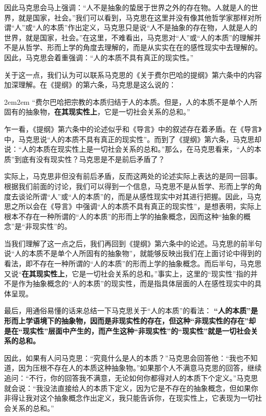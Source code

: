 \documentclass[a4paper,twoside,12pt,AutoFakeBold]{ctexart}
\begin{document}
因此马克思会马上强调：“人不是抽象的蛰居于世界之外的存在物。人就是人的世界，就是国家，社会。”我们可以看到，马克思在这里并没有像其他哲学家那样对所谓“人”或“人的本质”作出定义，马克思只是说“人不是抽象的存在物，人就是人的世界，就是国家，社会。”在这里，不难看出，马克思对“人”或“人的本质”的理解并不是从哲学、形而上学的角度去理解的，而是从实实在在的感性现实中去理解的。因此，马克思会着重强调：“人的本质不具有真正的现实性。”

关于这一点，我们认为可以联系马克思的《关于费尔巴哈的提纲》第六条中的内容加深理解。在《提纲》的第六条，马克思是这么说的：

\begin{adjustwidth}{2em}{2em}
\qquad\fangsong
“费尔巴哈把宗教的本质归结于人的本质。但是，人的本质不是单个人所固有的抽象物，\textbf{在其现实性上}，它是一切社会关系的总和。”
\end{adjustwidth}

乍一看，《提纲》第六条中的论述似乎和《导言》中的叙述存在着矛盾。在《导言》中，马克思说“人的本质不具有真正的现实性”。而到了《提纲》第六条，马克思却说：“人的本质在现实性上是一切社会关系的总和。”那么，在马克思看来，“人的本质”到底有没有现实性？马克思是不是前后矛盾了？

实际上，马克思非但没有前后矛盾，反而这两处的论述实际上表达的是同一回事。根据我们前面的讨论，我们可以得到一个信息，马克思不是从哲学、形而上学的角度去谈论所谓“人”或“人的本质”的，而是从感性现实中对其进行把握。因此，马克思之所以会在《导言》中强调“人的本质不具有真正的现实性”，是想表明，实际上根本不存在一种所谓的“人的本质”的形而上学的抽象概念，因而这种“抽象的概念”是“非现实性”的。

当我们理解了这一点之后，我们再回到《提纲》第六条中的论述。马克思的前半句说“人的本质不是单个人所固有的抽象物”，就能够反映出我们在上面讨论中得到的看法，即不存在一种所谓的“人的本质”的形而上学的抽象概念。而后半句，马克思又说“\textbf{在其现实性上}，它是一切社会关系的总和。”事实上，这里的“现实性”指的并不是作为抽象概念的“人的本质”的现实性，而是指具体层面的人在感性现实中的具体呈现。

最后，用通俗易懂的话来总结一下马克思关于“人的本质”的看法：
\textbf{“人的本质”是形而上学语境下的抽象物，因而是非现实性的存在，但这种“非现实性的存在”却是在“现实性”层面中产生的，而产生这种“非现实性”的“现实性”就是一切社会关系的总和。}

{\kaishu 因此，如果有人问马克思：“究竟什么是人的本质？”马克思会回答他：“我也不知道，因为压根不存在人的本质这种抽象物。”如果那个人不满意马克思的回答，继续追问：“不行，你的回答我不满意，无论如何你都得对人的本质下个定义。”马克思就会说：“我没法直接给人的本质下定义，因为它是不存在的抽象概念，但如果你非得让我对这个抽象概念作出定义，我只能告诉你，在现实性上，它表现为一切社会关系的总和。”}
\end{document}
